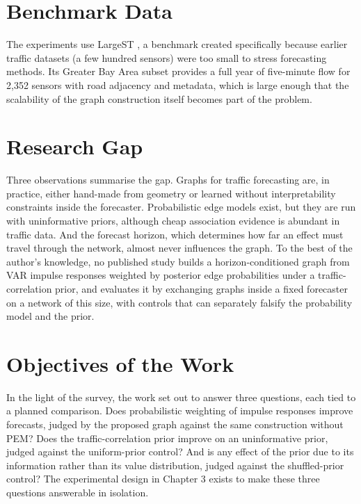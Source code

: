 \documentclass[MTech]{ugthesis}
\begin{document}
\section{Benchmark Data}
The experiments use LargeST \citep{liu2023largest}, a benchmark created specifically because earlier traffic datasets (a few hundred sensors) were too small to stress forecasting methods. Its Greater Bay Area subset provides a full year of five-minute flow for 2,352 sensors with road adjacency and metadata, which is large enough that the scalability of the graph construction itself becomes part of the problem.

\section{Research Gap}
Three observations summarise the gap. Graphs for traffic forecasting are, in practice, either hand-made from geometry or learned without interpretability constraints inside the forecaster. Probabilistic edge models exist, but they are run with uninformative priors, although cheap association evidence is abundant in traffic data. And the forecast horizon, which determines how far an effect must travel through the network, almost never influences the graph. To the best of the author's knowledge, no published study builds a horizon-conditioned graph from VAR impulse responses weighted by posterior edge probabilities under a traffic-correlation prior, and evaluates it by exchanging graphs inside a fixed forecaster on a network of this size, with controls that can separately falsify the probability model and the prior.

\section{Objectives of the Work}
In the light of the survey, the work set out to answer three questions, each tied to a planned comparison. Does probabilistic weighting of impulse responses improve forecasts, judged by the proposed graph against the same construction without PEM? Does the traffic-correlation prior improve on an uninformative prior, judged against the uniform-prior control? And is any effect of the prior due to its information rather than its value distribution, judged against the shuffled-prior control? The experimental design in Chapter 3 exists to make these three questions answerable in isolation.

\end{document}

